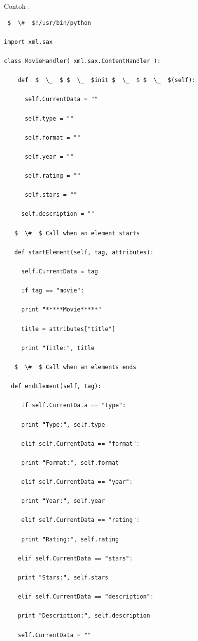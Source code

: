 \vspace{12pt}
Contoh : 
\begin{verbatim}
 $  \#  $!/usr/bin/python 
 
import xml.sax 
 
class MovieHandler( xml.sax.ContentHandler ): 
 
    def  $  \_  $ $  \_  $init $  \_  $ $  \_  $(self): 
 
      self.CurrentData = "" 
 
      self.type = "" 
 
      self.format = "" 
 
      self.year = "" 
 
      self.rating = "" 
 
      self.stars = "" 
 
     self.description = "" 
 
   $  \#  $ Call when an element starts 
 
   def startElement(self, tag, attributes): 
 
     self.CurrentData = tag 
 
     if tag == "movie": 
 
     print "*****Movie*****" 
 
     title = attributes["title"] 
 
     print "Title:", title 
 
   $  \#  $ Call when an elements ends 
 
  def endElement(self, tag): 
 
     if self.CurrentData == "type": 
 
     print "Type:", self.type 
 
     elif self.CurrentData == "format": 
 
     print "Format:", self.format 
 
     elif self.CurrentData == "year": 
 
     print "Year:", self.year 
 
     elif self.CurrentData == "rating": 
 
     print "Rating:", self.rating 
 
    elif self.CurrentData == "stars": 
 
    print "Stars:", self.stars 
 
    elif self.CurrentData == "description": 
 
    print "Description:", self.description 
 
    self.CurrentData = "" 


\end{verbatim}
